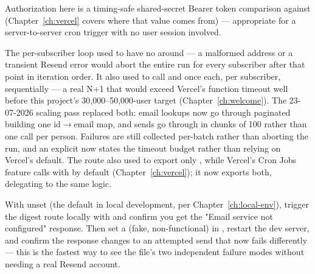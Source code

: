 Authorization here is a timing-safe shared-secret Bearer token comparison against  (Chapter~\ref{ch:vercel} covers where that value comes from) — appropriate for a server-to-server cron trigger with no user session involved.

\begin{olknote}
The per-subscriber loop used to have no  around  — a malformed address or a transient Resend error would abort the entire run for every subscriber after that point in iteration order. It also used to call  and  once each, per subscriber, sequentially — a real N+1 that would exceed Vercel's function timeout well before this project's 30,000--50,000-user target (Chapter~\ref{ch:welcome}). The 23-07-2026 scaling pass replaced both: email lookups now go through paginated  building one id$\to$email map, and sends go through  in chunks of 100 rather than one  call per person. Failures are still collected per-batch rather than aborting the run, and an explicit  now states the timeout budget rather than relying on Vercel's default. The route also used to export only , while Vercel's Cron Jobs feature calls with  by default (Chapter~\ref{ch:vercel}); it now exports both, delegating to the same  logic.
\end{olknote}

\begin{olktask}
With  unset (the default in local development, per Chapter~\ref{ch:local-env}), trigger the digest route locally with  and confirm you get the  "Email service not configured" response. Then set a (fake, non-functional)  in , restart the dev server, and confirm the response changes to an attempted send that now fails differently — this is the fastest way to see the file's two independent failure modes without needing a real Resend account.
\end{olktask}
